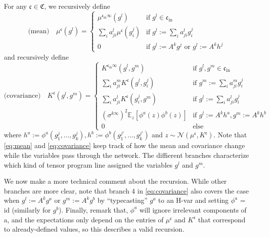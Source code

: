 \documentclass[11pt,notitlepage]{article}
\numberwithin{equation}{section}
\def\normdist{\mathcal{N}}
\theoremstyle{remark}
\theoremstyle{definition}
\begin{document}
	For any $\mathfrak{c} \in \mathfrak{C}$, we recursively define
	\begin{equation}\label{eq:mean}
	\text{(mean)} \quad \mu^{\mathfrak{c}}(g^l) =
	\begin{cases}
	\mu^{\mathfrak{c}_{\text{in}}\infty}(g^l) & \text{if } g^l \in \mathfrak{c}_{\text{in}}\\
	\sum_i a^l_{ji} \mu^{\mathfrak{c}}(g^j_i) & \text{if } g^l := \sum_i a^l_{ji} g^j_i \\
	0 & \text{if } g^l := A^k g^j \text{ or } g^l := A^k h^j
	\end{cases}
	\end{equation}
	and recursively define
	\begin{equation}\label{eq:covariance}
	\text{(covariance)} \quad K^{\mathfrak{c}}(g^l, g^m) =
	\begin{cases}
	K^{\mathfrak{c}_{\text{in}}\infty}(g^l, g^m) & \text{if } g^l, g^m \in \mathfrak{c}_{\text{in}}\\
	\sum_i a^m_{ji} K^{\mathfrak{c}}(g^l, g^j_i) & \text{if } g^m := \sum_i a^m_{ji} g^j_i \\
	\sum_i a^l_{ji} K^{\mathfrak{c}}(g^j_i, g^m) & \text{if } g^l := \sum_i a^l_{ji} g^j_i \\
	(\sigma^{k\infty})^2 \mathbb{E}_z[\phi^a(z)\phi^b(z)] & \text{if } g^l:= A^k h^a, g^m := A^k h^b \\
	0 & \text{else}
	\end{cases}
	\end{equation}
	where $h^a := \phi^a(g^j_1, \dots, g^j_k), h^b := \phi^b(g^{j'}_1, \dots, g^{j'}_k)$ and $z \sim \normdist(\mu^{\mathfrak{c}}, K^{\mathfrak{c}})$.
	Note that \eqref{eq:mean} and \eqref{eq:covariance} keep track of how the mean and covariance change while the variables pass through the network. The diffierent branches characterize which kind of tensor program line assigned the variables $g^l$ and $g^m$.
	
	We now make a more technical comment about the recursion.
	While other branches are more clear, note that branch 4 in \eqref{eq:covariance} also covers the case when $g^l := A^k g^a$ or $g^m := A^k g^b$ by ``typecasting'' $g^a$ to an H-var and setting $\phi^a$ = id (similarly for $g^b$).
	Finally, remark that, $\phi^a$ will ignore irrelevant components of a, and the expectations only depend on the entries of $\mu^{\mathfrak{c}}$ and $K^{\mathfrak{c}}$ that correspond to already-defined values, so this describes a valid recursion.
	
\end{document}
